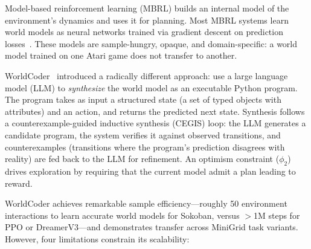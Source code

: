 \documentclass{article}
\begin{document}
Model-based reinforcement learning (MBRL) builds an internal model of the
environment's dynamics and uses it for planning.  Most MBRL systems learn
world models as neural networks trained via gradient descent on prediction
losses~\cite{ha2018world, hafner2020dreamer, schrittwieser2020muzero}.  These
models are sample-hungry, opaque, and domain-specific: a world model trained on
one Atari game does not transfer to another.

WorldCoder~\cite{tang2024worldcoder} introduced a radically different approach:
use a large language model (LLM) to \emph{synthesize} the world model as an
executable Python program.  The program takes as input a structured state
(a set of typed objects with attributes) and an action, and returns the
predicted next state.  Synthesis follows a counterexample-guided inductive
synthesis (CEGIS) loop: the LLM generates a candidate program, the system
verifies it against observed transitions, and counterexamples (transitions
where the program's prediction disagrees with reality) are fed back to the
LLM for refinement.  An optimism constraint ($\phi_2$) drives exploration by
requiring that the current model admit a plan leading to reward.

WorldCoder achieves remarkable sample efficiency---roughly 50 environment
interactions to learn accurate world models for Sokoban, versus $>$1M steps
for PPO or DreamerV3---and demonstrates transfer across MiniGrid task variants.
However, four limitations constrain its scalability:
\end{document}
